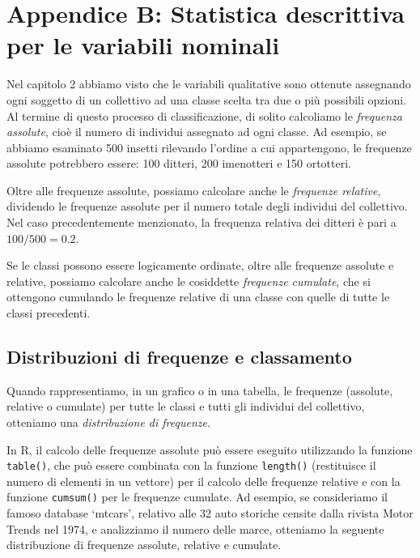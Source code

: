 \documentclass[
  12pt,
]{book}
\begin{document}
\hypertarget{appendice-b-statistica-descrittiva-per-le-variabili-nominali}{%
\chapter{Appendice B: Statistica descrittiva per le variabili nominali}\label{appendice-b-statistica-descrittiva-per-le-variabili-nominali}}

Nel capitolo 2 abbiamo visto che le variabili qualitative sono ottenute assegnando ogni soggetto di un collettivo ad una classe scelta tra due o più possibili opzioni. Al termine di questo processo di classificazione, di solito calcoliamo le \emph{frequenza assolute}, cioè il numero di individui assegnato ad ogni classe. Ad esempio, se abbiamo esaminato 500 insetti rilevando l'ordine a cui appartengono, le frequenze assolute potrebbero essere: 100 ditteri, 200 imenotteri e 150 ortotteri.

Oltre alle frequenze assolute, possiamo calcolare anche le \emph{frequenze relative}, dividendo le frequenze assolute per il numero totale degli individui del collettivo. Nel caso precedentemente menzionato, la frequenza relativa dei ditteri è pari a \(100/500 = 0.2\).

Se le classi possono essere logicamente ordinate, oltre alle frequenze assolute e relative, possiamo calcolare anche le cosiddette \emph{frequenze cumulate}, che si ottengono cumulando le frequenze relative di una classe con quelle di tutte le classi precedenti.

\hypertarget{distribuzioni-di-frequenze-e-classamento}{%
\section{Distribuzioni di frequenze e classamento}\label{distribuzioni-di-frequenze-e-classamento}}

Quando rappresentiamo, in un grafico o in una tabella, le frequenze (assolute, relative o cumulate) per tutte le classi e tutti gli individui del collettivo, otteniamo una \emph{distribuzione di frequenze}.

In R, il calcolo delle frequenze assolute può essere eseguito utilizzando la funzione \texttt{table()}, che può essere combinata con la funzione \texttt{length()} (restituisce il numero di elementi in un vettore) per il calcolo delle frequenze relative e con la funzione \texttt{cumsum()} per le frequenze cumulate. Ad esempio, se consideriamo il famoso database `mtcars', relativo alle 32 auto storiche censite dalla rivista Motor Trends nel 1974, e analizziamo il numero delle marce, otteniamo la seguente distribuzione di frequenze assolute, relative e cumulate.
\end{document}

